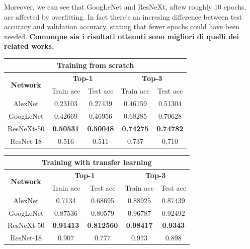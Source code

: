 \documentclass{article}
\begin{document}
Moreover, we can see that GoogLeNet and ResNeXt, aftew roughly 10 epochs, are affected by overfitting. In fact there's an incresing difference between test accuracy and validation accuracy, stating that fewer epochs could have been needed. \textbf{Comunque sia i risultati ottenuti sono migliori di quelli dei related works.}



\begin{table}[]
	\begin{tabular}{|c|c|c|c|c|}
		\hline
		\multicolumn{5}{|c|}{\textbf{Training from scratch}}                                                          \\ \hline
		\multirow{2}{*}{\textbf{Network}} & \multicolumn{2}{c|}{\textbf{Top-1}} & \multicolumn{2}{c|}{\textbf{Top-3}} \\ \cline{2-5} 
		& Train acc        & Test acc         & Train acc        & Test acc         \\ \hline
		AlexNet                           & 0.23103          & 0.27439          & 0.46159          & 0.51304          \\ \hline
		GoogLeNet                         & 0.42669          & 0.46956          & 0.68285          & 0.70628          \\ \hline
		ResNeXt-50                        & \textbf{0.50531} & \textbf{0.50048} & \textbf{0.74275} & \textbf{0.74782} \\ \hline
		ResNet-18 \cite{ArtistIdCNN406}                    & 0.516            & 0.511            & 0.737            & 0,710            \\ \hline
	\end{tabular}
	\begin{tabular}{|c|c|c|c|c|}
		\hline
		\multicolumn{5}{|c|}{\textbf{Training with transfer learning}}                                                           \\ \hline
		\multirow{2}{*}{\textbf{Network}} & \multicolumn{2}{c|}{\textbf{Top-1}}  & \multicolumn{2}{c|}{\textbf{Top-3}} \\ \cline{2-5} 
		& Train acc        & Test acc          & Train acc         & Test acc        \\ \hline
		AlexNet                           & 0.7134           & 0.68695           & 0.88925           & 0.87439         \\ \hline
		GoogLeNet                         & 0.87536          & 0.80579           & 0.96787           & 0.92492         \\ \hline
		ResNeXt-50                        & \textbf{0.91413} & \textbf{0.812560} & \textbf{0.98417}  & \textbf{0.9343} \\ \hline
		ResNet-18 \cite{ArtistIdCNN406}                    & 0.907            & 0.777             & 0.973             & 0.898           \\ \hline
	\end{tabular}
\end{table}
\end{document}
